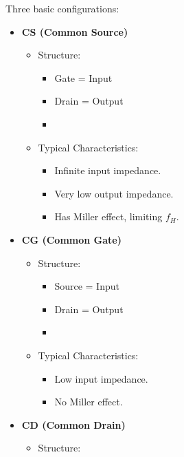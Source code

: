 \begin{multicols}{2}
\begin{CheatsheetEntryFrame}
        Three basic configurations:
        \begin{itemize}
            \item \textbf{CS (Common Source)}
            \begin{itemize}
                \item Structure:
                \begin{itemize}
                    \item Gate = Input
                    \item Drain = Output
                    \item {}
                \end{itemize}
                \item Typical Characteristics:
                \begin{itemize}
                    \item Infinite input impedance.
                    \item Very low output impedance.
                    \item Has Miller effect, limiting $f_H$.
                \end{itemize}
            \end{itemize}
            \item \textbf{CG (Common Gate)}
            \begin{itemize}
                \item Structure:
                \begin{itemize}
                    \item Source = Input
                    \item Drain = Output
                    \item {}
                \end{itemize}
                \item Typical Characteristics:
                \begin{itemize}
                    \item Low input impedance.
                    \item No Miller effect.
                \end{itemize}
            \end{itemize}
            \item \textbf{CD (Common Drain)}
            \begin{itemize}
                \item Structure:

\end{itemize}
\end{itemize}
\end{CheatsheetEntryFrame}
\end{multicols}
